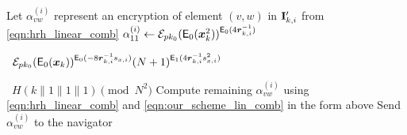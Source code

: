 \documentclass[twocolumn]{autart}
\begin{document}
\begin{algorithm}
\begin{algorithmic}[1]
        \State Let $\alpha_{vw}^{(i)}$ represent an encryption of element $(v,w)$ in ${{\mathbf{I}}}'_{k,i}$ from \eqref{eqn:hrh_linear_comb}
        \State $\alpha_{11}^{(i)} \gets \mathcal{E}_{pk_0}(\mathsf{E}_{0}({\boldsymbol{x}}^2_k))^{\mathsf{E}_{0}(4{\boldsymbol{r}}_{k, i}^{-1})}$\par
        \ $\mathcal{E}_{pk_0}(\mathsf{E}_{0}({\boldsymbol{x}}_k))^{\mathsf{E}_{0}(-8{\boldsymbol{r}}_{k, i}^{-1}s_{x,i})}
        (N+1)^{\mathsf{E}_{1}(4{\boldsymbol{r}}_{k, i}^{-1}s_{x,i}^2)}$\par
        \ $H(k\mathbin\|1\mathbin\|1\mathbin\|1)\pmod{N^2}$
        \State Compute remaining $\alpha_{vw}^{(i)}$ using \eqref{eqn:hrh_linear_comb} and \eqref{eqn:our_scheme_lin_comb} in the form above
                \State Send $\alpha_{vw}^{(i)}$ to the navigator
            \EndFor
        \EndFor
        \EndProcedure
    \end{algorithmic}
\end{algorithm}
\end{document}
